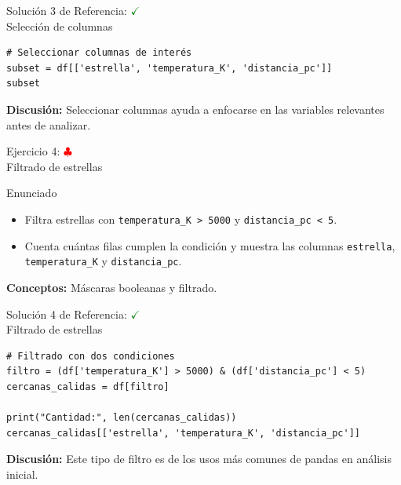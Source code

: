 \documentclass[10pt]{beamer}
\begin{document}
\begin{solutionblock}
\begin{frame}[fragile]{Solución 3 de Referencia: \hfill \textcolor{green}{$\checkmark$} \\ Selección de columnas}
\begin{verbatim}
# Seleccionar columnas de interés
subset = df[['estrella', 'temperatura_K', 'distancia_pc']]
subset
\end{verbatim}
\textbf{Discusión:} Seleccionar columnas ayuda a enfocarse en las variables relevantes antes de analizar.
\end{frame}
\end{solutionblock}

\begin{frame}{Ejercicio 4: \hfill \textcolor{red}{$\clubsuit$} \\ Filtrado de estrellas}
\begin{block}{Enunciado}
  \begin{itemize}
    \item Filtra estrellas con \texttt{temperatura\_K > 5000} y \texttt{distancia\_pc < 5}.
    \item Cuenta cuántas filas cumplen la condición y muestra las columnas \texttt{estrella}, \texttt{temperatura\_K} y \texttt{distancia\_pc}.
  \end{itemize}
\end{block}
\textbf{Conceptos:} Máscaras booleanas y filtrado.
\end{frame}

\begin{solutionblock}
\begin{frame}[fragile]{Solución 4 de Referencia: \hfill \textcolor{green}{$\checkmark$} \\ Filtrado de estrellas}
\begin{verbatim}
# Filtrado con dos condiciones
filtro = (df['temperatura_K'] > 5000) & (df['distancia_pc'] < 5)
cercanas_calidas = df[filtro]

print("Cantidad:", len(cercanas_calidas))
cercanas_calidas[['estrella', 'temperatura_K', 'distancia_pc']]
\end{verbatim}
\textbf{Discusión:} Este tipo de filtro es de los usos más comunes de pandas en análisis inicial.
\end{frame}
\end{solutionblock}
\end{document}
